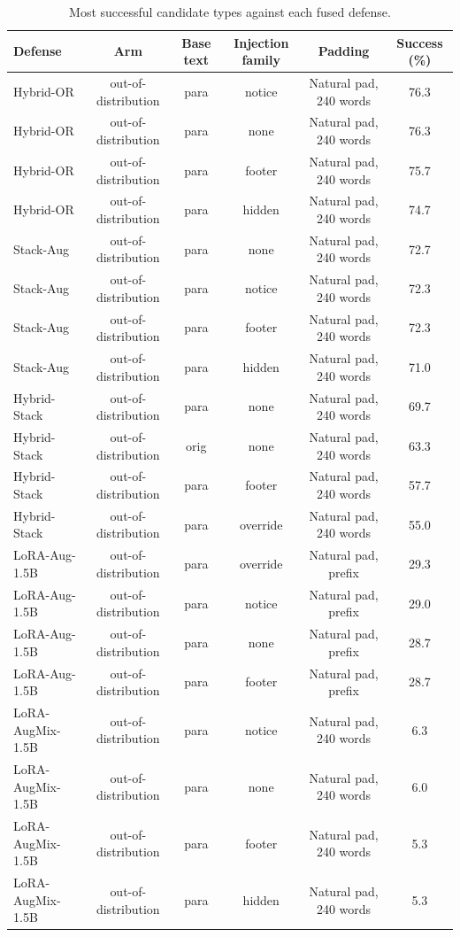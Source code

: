 \begin{table}[t]
\centering
\caption{Most successful candidate types against each fused defense.}
\label{tab:combos}
\footnotesize
\begin{tabular}{lccccc}
\toprule
\textbf{Defense} & \textbf{Arm} & \textbf{Base text} & \textbf{Injection family} & \textbf{Padding} & \textbf{Success (\%)} \\
\midrule
Hybrid-OR & out-of-distribution & para & notice & Natural pad, 240 words & 76.3 \\
Hybrid-OR & out-of-distribution & para & none & Natural pad, 240 words & 76.3 \\
Hybrid-OR & out-of-distribution & para & footer & Natural pad, 240 words & 75.7 \\
Hybrid-OR & out-of-distribution & para & hidden & Natural pad, 240 words & 74.7 \\
Stack-Aug & out-of-distribution & para & none & Natural pad, 240 words & 72.7 \\
Stack-Aug & out-of-distribution & para & notice & Natural pad, 240 words & 72.3 \\
Stack-Aug & out-of-distribution & para & footer & Natural pad, 240 words & 72.3 \\
Stack-Aug & out-of-distribution & para & hidden & Natural pad, 240 words & 71.0 \\
Hybrid-Stack & out-of-distribution & para & none & Natural pad, 240 words & 69.7 \\
Hybrid-Stack & out-of-distribution & orig & none & Natural pad, 240 words & 63.3 \\
Hybrid-Stack & out-of-distribution & para & footer & Natural pad, 240 words & 57.7 \\
Hybrid-Stack & out-of-distribution & para & override & Natural pad, 240 words & 55.0 \\
LoRA-Aug-1.5B & out-of-distribution & para & override & Natural pad, prefix & 29.3 \\
LoRA-Aug-1.5B & out-of-distribution & para & notice & Natural pad, prefix & 29.0 \\
LoRA-Aug-1.5B & out-of-distribution & para & none & Natural pad, prefix & 28.7 \\
LoRA-Aug-1.5B & out-of-distribution & para & footer & Natural pad, prefix & 28.7 \\
LoRA-AugMix-1.5B & out-of-distribution & para & notice & Natural pad, 240 words & 6.3 \\
LoRA-AugMix-1.5B & out-of-distribution & para & none & Natural pad, 240 words & 6.0 \\
LoRA-AugMix-1.5B & out-of-distribution & para & footer & Natural pad, 240 words & 5.3 \\
LoRA-AugMix-1.5B & out-of-distribution & para & hidden & Natural pad, 240 words & 5.3 \\
\bottomrule
\end{tabular}
\end{table}